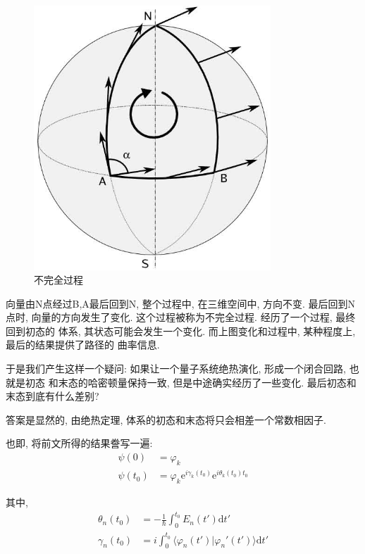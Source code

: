\documentclass[a4paper, 11pt]{article}
\begin{document}
\begin{spacing}{1.2}
        \begin{figure}[H]
          \centering\includegraphics[width=3.5in]{image/barryphase.jpg}
          \caption{不完全过程}\label{pic_barryphase}
        \end{figure} 
        
        向量由N点经过B,A最后回到N, 整个过程中, 在三维空间中, 方向不变. 最后回到N点时,
        向量的方向发生了变化. 这个过程被称为不完全过程. 经历了一个过程, 最终回到初态的
        体系, 其状态可能会发生一个变化. 而上图变化和过程中, 某种程度上, 最后的结果提供了路径的
        曲率信息.

        于是我们产生这样一个疑问: 如果让一个量子系统绝热演化, 形成一个闭合回路, 也就是初态
        和末态的哈密顿量保持一致, 但是中途确实经历了一些变化. 最后初态和末态到底有什么差别?

        答案是显然的, 由绝热定理, 体系的初态和末态将只会相差一个常数相因子.   

        也即, 将前文所得的结果誊写一遍:
        \begin{equation}
          \begin{aligned}
            \psi(0) &= \varphi_k\\
            \psi(t_0) &= \varphi_k\mathrm{e}^{i\gamma_k(t_0)}\mathrm{e}^{i\theta_k(t_0)t_0}
          \end{aligned}  
        \end{equation}

        其中,
        \begin{equation}
          \begin{aligned}
            \theta_n(t_0) &= -\frac{1}{\hbar}\int_0^{t_0}E_n(t')\mathrm{d}t'\\
            \gamma_n(t_0) &= i\int_0^{t_0}\langle\varphi_n(t')|\varphi_n'(t')\rangle{}\mathrm{d}t'
          \end{aligned}
        \end{equation}


\end{spacing}
\end{document}

